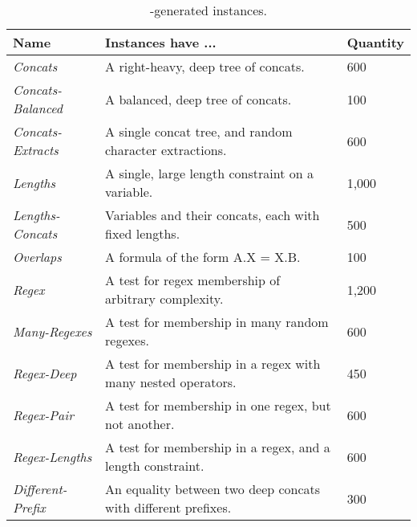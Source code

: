 \begin{table}[t]
    \centering
    \caption{\generator{}-generated instances.}
    \label{tbl:generated}
    \begin{tabular}{|l|l|l|}
        \hline
        \textbf{Name}
            & \textbf{Instances have ...}
            & \textbf{Quantity}
            \\ \hline
        \textit{Concats}
            & A right-heavy, deep tree of concats.
            & 600
            \\ \hline
        \textit{Concats-Balanced}
            & A balanced, deep tree of concats.
            & 100
            \\ \hline
        \textit{Concats-Extracts}
            & A single concat tree, and random character extractions.
            & 600
            \\ \hline
        \textit{Lengths}
            & A single, large length constraint on a variable.
            & 1,000
            \\ \hline
        \textit{Lengths-Concats}
            & Variables and their concats, each with fixed lengths.
            & 500
            \\ \hline
        \textit{Overlaps}
            & A formula of the form A.X = X.B.
            & 100
            \\ \hline
        \textit{Regex}
            & A test for regex membership of arbitrary complexity.
            & 1,200
            \\ \hline
        \textit{Many-Regexes}
            & A test for membership in many random regexes.
            & 600
            \\ \hline
        \textit{Regex-Deep}
            & A test for membership in a regex with many nested operators.
            & 450
            \\ \hline
        \textit{Regex-Pair}
            & A test for membership in one regex, but not another.
            & 600
            \\ \hline
        \textit{Regex-Lengths}
            & A test for membership in a regex, and a length constraint.
            & 600
            \\ \hline
        \textit{Different-Prefix}
            & An equality between two deep concats with different prefixes.
            & 300
            \\ \hline
    \end{tabular}
\end{table}

